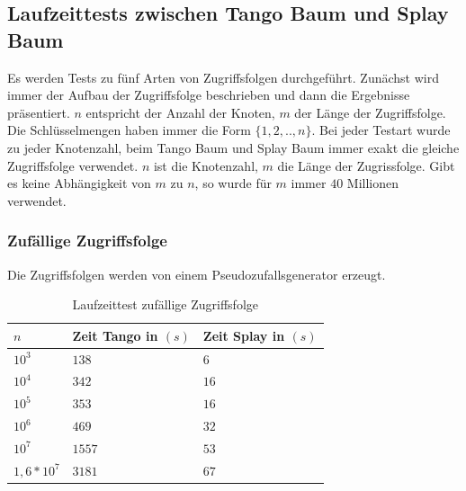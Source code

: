 \documentclass[a4paper,12pt]{article}
\begin{document}
\subsection {Laufzeittests zwischen Tango Baum und Splay Baum}






Es werden Tests zu fünf Arten von Zugriffsfolgen durchgeführt. Zunächst wird immer der Aufbau der Zugriffsfolge beschrieben und dann die Ergebnisse präsentiert. $n$ entspricht der Anzahl der Knoten, $m$ der Länge der Zugriffsfolge. Die Schlüsselmengen haben immer die Form $\{1,2,..,n\}$. Bei jeder Testart wurde zu jeder Knotenzahl, beim Tango Baum und Splay Baum immer exakt die gleiche Zugriffsfolge verwendet. $n$ ist die Knotenzahl, $m$ die Länge der Zugrissfolge. Gibt es keine Abhängigkeit von $m$ zu $n$, so wurde für $m$ immer $40$ Millionen verwendet.

\subsubsection{Zufällige Zugriffsfolge}
Die Zugriffsfolgen werden von einem Pseudozufallsgenerator erzeugt. 

  \begin{table}[H]
	\begin{center}
		\begin{tabular}[c]{|l|l|l|}
			\hline
			$n$ & Zeit Tango in $\left(s\right)$ &Zeit Splay in $\left(s\right)$ \\
			\hline
			$10^3$ & $138$ &$6$ \\
			\hline
			$10^4$  & $342$ &$16$  \\
			\hline
			$10^5$  & $353$ &$16$  \\
			\hline
			$10^6$  & $469$ &$32$  \\
			\hline
			$10^7$  & $1557$ &$53$  \\
			\hline
			$1,6 *10^7$  & $3181$ &$67$  \\
			\hline
		\end{tabular}
		\caption{Laufzeittest zufällige Zugriffsfolge} 
	\end{center}
\end{table}
\end{document}
